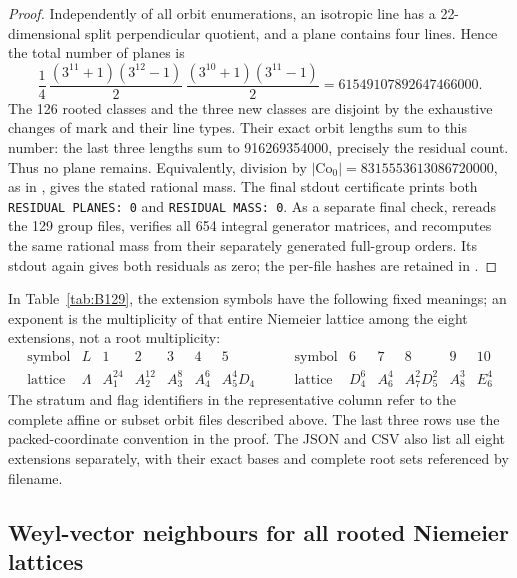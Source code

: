 \begin{proof}
Independently of all orbit enumerations, an isotropic line has a
22-dimensional split perpendicular quotient, and a plane contains
four lines. Hence the total number of planes is
\[
 \frac14\,
 \frac{(3^{11}+1)(3^{12}-1)}2\,
 \frac{(3^{10}+1)(3^{11}-1)}2
 =61549107892647466000.
\]
The 126 rooted classes and the three new classes are disjoint by
the exhaustive changes of mark and their line types. Their exact
orbit lengths sum to this number: the last three lengths sum to
916269354000, precisely the residual count. Thus no plane remains.
Equivalently, division by
\(|\mathrm{Co}_0|=8315553613086720000\), as in
\citet[Theorem 1.1]{B_BrouwerLeech}, gives the stated rational mass.
The final stdout certificate  prints
both \texttt{RESIDUAL PLANES: 0} and \texttt{RESIDUAL MASS: 0}.
As a separate final check,  rereads the
129 group files, verifies all 654 integral generator matrices, and
recomputes the same rational mass from their separately generated
full-group orders. Its stdout again gives both residuals as zero;
the per-file hashes are retained in .
\end{proof}

In Table~\ref{tab:B129}, the extension symbols have the following
fixed meanings; an exponent is the multiplicity of that entire
Niemeier lattice among the eight extensions, not a root multiplicity:
\[
\begin{array}{c|cccccc}
\text{symbol}&L&1&2&3&4&5\\\hline
\text{lattice}&\Lambda&A_1^{24}&A_2^{12}&A_3^8&A_4^6&A_5^4D_4
\end{array}
\qquad
\begin{array}{c|ccccc}
\text{symbol}&6&7&8&9&10\\\hline
\text{lattice}&D_4^6&A_6^4&A_7^2D_5^2&A_8^3&E_6^4
\end{array}
\]
The stratum and flag identifiers in the representative column refer
to the complete affine or subset orbit files described above. The
last three rows use the packed-coordinate convention in the proof.
The JSON and CSV also list all eight extensions separately, with
their exact bases and complete root sets referenced by filename.
{\scriptsize\setlength{\tabcolsep}{3pt}
}

\subsection{Weyl-vector neighbours for all rooted Niemeier lattices}

